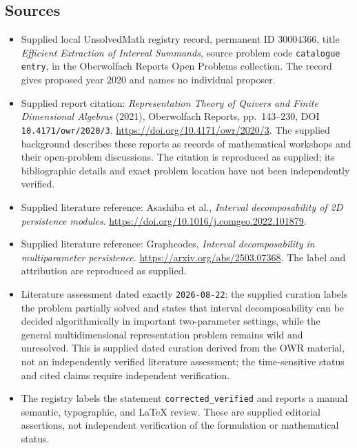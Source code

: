 \documentclass[11pt]{article}
\begin{document}
\subsection{Sources}
\begin{itemize}
\item Supplied local UnsolvedMath registry record, permanent ID $30004366$, title \emph{Efficient Extraction of Interval Summands}, source problem code \texttt{catalogue entry}, in the Oberwolfach Reports Open Problems collection. The record gives proposed year $2020$ and names no individual proposer.
\item Supplied report citation: \emph{Representation Theory of Quivers and Finite Dimensional Algebras} (2021), Oberwolfach Reports, pp.~143--230, DOI \texttt{10.4171/owr/2020/3}. \url{https://doi.org/10.4171/owr/2020/3}. The supplied background describes these reports as records of mathematical workshops and their open-problem discussions. The citation is reproduced as supplied; its bibliographic details and exact problem location have not been independently verified.
\item Supplied literature reference: Asashiba et al., \emph{Interval decomposability of 2D persistence modules}. \url{https://doi.org/10.1016/j.comgeo.2022.101879}.
\item Supplied literature reference: Graphcodes, \emph{Interval decomposability in multiparameter persistence}. \url{https://arxiv.org/abs/2503.07368}. The label and attribution are reproduced as supplied.
\item Literature assessment dated exactly \texttt{2026-08-22}: the supplied curation labels the problem partially solved and states that interval decomposability can be decided algorithmically in important two-parameter settings, while the general multidimensional representation problem remains wild and unresolved. This is supplied dated curation derived from the OWR material, not an independently verified literature assessment; the time-sensitive status and cited claims require independent verification.
\item The registry labels the statement \texttt{corrected\_verified} and reports a manual semantic, typographic, and LaTeX review. These are supplied editorial assertions, not independent verification of the formulation or mathematical status.
\end{itemize}
\end{document}

